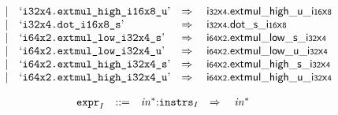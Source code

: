 $$\begin{array}[t]{@{}lrrl@{}l@{}l@{}l@{}}
& & | & \mbox{‘\texttt{i32x4.extmul\_high\_i16x8\_u}’} & \quad\Rightarrow\quad{} & {\mathsf{i{\scriptstyle 32}}}{\mathsf{x}}{\mathsf{{\scriptstyle 4}}} {.} {{\mathsf{extmul}}{\mathsf{\_}}{\mathsf{high}}{\mathsf{\_}}{\mathsf{u}}}{\mathsf{\_}}{{\mathsf{i{\scriptstyle 16}}}{\mathsf{x}}{\mathsf{{\scriptstyle 8}}}} \\
& & | & \mbox{‘\texttt{i32x4.dot\_i16x8\_s}’} & \quad\Rightarrow\quad{} & {\mathsf{i{\scriptstyle 32}}}{\mathsf{x}}{\mathsf{{\scriptstyle 4}}} {.} {{\mathsf{dot}}{\mathsf{\_}}{\mathsf{s}}}{\mathsf{\_}}{{\mathsf{i{\scriptstyle 16}}}{\mathsf{x}}{\mathsf{{\scriptstyle 8}}}} \\
& & | & \mbox{‘\texttt{i64x2.extmul\_low\_i32x4\_s}’} & \quad\Rightarrow\quad{} & {\mathsf{i{\scriptstyle 64}}}{\mathsf{x}}{\mathsf{{\scriptstyle 2}}} {.} {{\mathsf{extmul}}{\mathsf{\_}}{\mathsf{low}}{\mathsf{\_}}{\mathsf{s}}}{\mathsf{\_}}{{\mathsf{i{\scriptstyle 32}}}{\mathsf{x}}{\mathsf{{\scriptstyle 4}}}} \\
& & | & \mbox{‘\texttt{i64x2.extmul\_low\_i32x4\_u}’} & \quad\Rightarrow\quad{} & {\mathsf{i{\scriptstyle 64}}}{\mathsf{x}}{\mathsf{{\scriptstyle 2}}} {.} {{\mathsf{extmul}}{\mathsf{\_}}{\mathsf{low}}{\mathsf{\_}}{\mathsf{u}}}{\mathsf{\_}}{{\mathsf{i{\scriptstyle 32}}}{\mathsf{x}}{\mathsf{{\scriptstyle 4}}}} \\
& & | & \mbox{‘\texttt{i64x2.extmul\_high\_i32x4\_s}’} & \quad\Rightarrow\quad{} & {\mathsf{i{\scriptstyle 64}}}{\mathsf{x}}{\mathsf{{\scriptstyle 2}}} {.} {{\mathsf{extmul}}{\mathsf{\_}}{\mathsf{high}}{\mathsf{\_}}{\mathsf{s}}}{\mathsf{\_}}{{\mathsf{i{\scriptstyle 32}}}{\mathsf{x}}{\mathsf{{\scriptstyle 4}}}} \\
& & | & \mbox{‘\texttt{i64x2.extmul\_high\_i32x4\_u}’} & \quad\Rightarrow\quad{} & {\mathsf{i{\scriptstyle 64}}}{\mathsf{x}}{\mathsf{{\scriptstyle 2}}} {.} {{\mathsf{extmul}}{\mathsf{\_}}{\mathsf{high}}{\mathsf{\_}}{\mathsf{u}}}{\mathsf{\_}}{{\mathsf{i{\scriptstyle 32}}}{\mathsf{x}}{\mathsf{{\scriptstyle 4}}}} \\
\end{array}
$$

\vspace{1ex}

$$
\begin{array}[t]{@{}lrrl@{}l@{}l@{}l@{}}
& {{\mathtt{expr}}}_{I} & ::= & {{\mathit{in}}^\ast}{:}{{\mathtt{instrs}}}_{I} & \quad\Rightarrow\quad{} & {{\mathit{in}}^\ast} \\
\end{array}
$$


